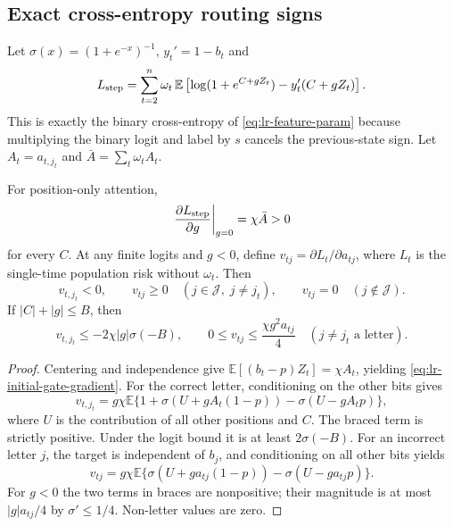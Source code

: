 \subsection{Exact cross-entropy routing signs}
\label{app:weak-routing-signs}

Let $\sigma(x)=(1+e^{-x})^{-1}$, $y_t'=1-b_t$ and
\begin{equation}\label{eq:lr-logistic-risk}
 L_{\mathrm{step}}=\sum_{t=2}^n\omega_t\,\mathbb E
 \left[\log(1+e^{C+gZ_t})-y_t'(C+gZ_t)\right].
\end{equation}
This is exactly the binary cross-entropy of
\eqref{eq:lr-feature-param} because multiplying the binary logit and
label by $s$ cancels the previous-state sign.
Let $A_t=a_{t,j_t}$ and $\bar A=\sum_t\omega_t A_t$.

\begin{lrlemma}
\label{lem:lr-signs}
For position-only attention,
\begin{equation}\label{eq:lr-initial-gate-gradient}
 \left.\frac{\partial L_{\mathrm{step}}}{\partial g}\right|_{g=0}
 =\chi\bar A>0
\end{equation}
for every $C$.  At any finite logits and $g<0$, define
$v_{tj}=\partial L_t/\partial a_{tj}$, where $L_t$ is the single-time
population risk without $\omega_t$.  Then
\begin{equation}\label{eq:lr-feature-source-signs}
 v_{t,j_t}<0,\qquad v_{tj}\ge0
 \quad(j\in\mathcal J,\;j\ne j_t),\qquad
 v_{tj}=0\quad(j\notin\mathcal J).
\end{equation}
If $|C|+|g|\le B$, then
\begin{equation}\label{eq:lr-source-bounds}
 v_{t,j_t}\le-2\chi|g|\sigma(-B),\qquad
 0\le v_{tj}\le\frac{\chi g^2a_{tj}}4\quad(j\ne j_t\text{ a letter}).
\end{equation}
\end{lrlemma}
\begin{proof}
Centering and independence give
$\mathbb E[(b_t-p)Z_t]=\chi A_t$, yielding
\eqref{eq:lr-initial-gate-gradient}.  For the correct letter,
conditioning on the other bits gives
\[
 v_{t,j_t}=g\chi\mathbb E
 \{1+\sigma(U+gA_t(1-p))-\sigma(U-gA_tp)\},
\]
where $U$ is the contribution of all other positions and $C$.
The braced term is strictly positive.  Under the logit bound it is at
least $2\sigma(-B)$.  For an incorrect letter $j$, the target is
independent of $b_j$, and conditioning on all other bits yields
\[
 v_{tj}=g\chi\mathbb E
 \{\sigma(U+ga_{tj}(1-p))-\sigma(U-ga_{tj}p)\}.
\]
For $g<0$ the two terms in braces are nonpositive; their magnitude is
at most $|g|a_{tj}/4$ by $\sigma'\le1/4$.  Non-letter values are zero.
\end{proof}

